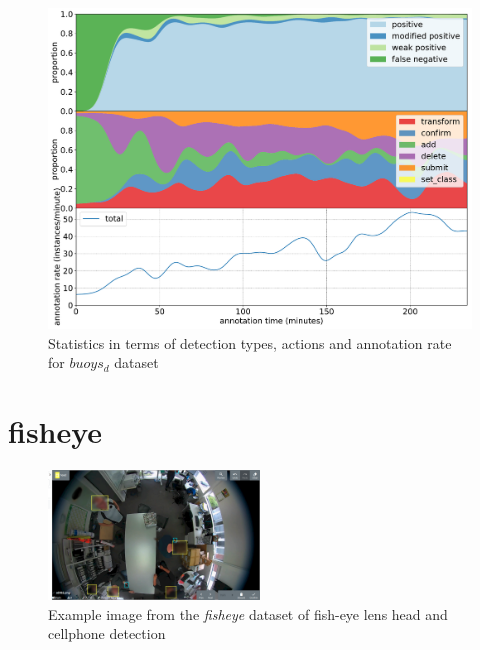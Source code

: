 \begin{figure}[!h]
\centering
\includegraphics[width=1.0\linewidth]{charts/action_annotations/buoys.pdf}
\caption{Statistics in terms of detection types, actions and annotation rate for $buoys_d$ dataset}
\label{fig:buoys_annotation}
\end{figure}

\pagebreak
\section{fisheye}
\label{sec:fisheye_details}


\begin{figure}[H]
\begin{center}
  \includegraphics[width=0.5\textwidth]{figures/annotation/screenshots/victor.png}
\end{center}
  \caption{Example image from the \emph{fisheye} dataset of fish-eye lens head and cellphone detection }
\end{figure}


